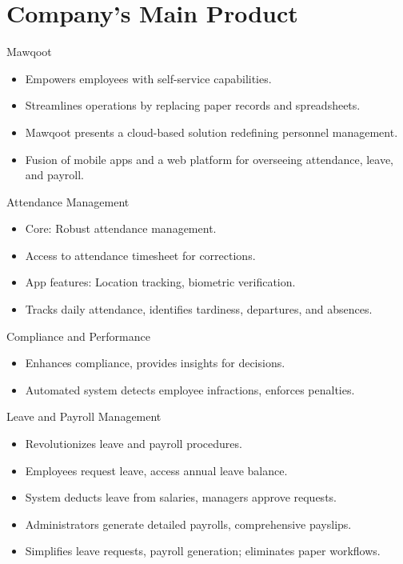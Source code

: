 \documentclass{loyola-beamer}
\begin{document}
\section{Company's Main Product}

\begin{frame}{Mawqoot}
	\begin{itemize}
		\item Empowers employees with self-service capabilities.
		\item Streamlines operations by replacing paper records and spreadsheets.
		\item Mawqoot presents a cloud-based solution redefining personnel management.
		\item Fusion of mobile apps and a web platform for overseeing attendance, leave, and payroll.
	\end{itemize}
\end{frame}

\begin{frame}{Attendance Management}
	\begin{itemize}
		\item Core: Robust attendance management.
		\item Access to attendance timesheet for corrections.
		\item App features: Location tracking, biometric verification.
		\item Tracks daily attendance, identifies tardiness, departures, and absences.
	\end{itemize}
\end{frame}

\begin{frame}{Compliance and Performance}
	\begin{itemize}
		\item Enhances compliance, provides insights for decisions.
		\item Automated system detects employee infractions, enforces penalties.
	\end{itemize}
\end{frame}

\begin{frame}{Leave and Payroll Management}
	\begin{itemize}
		\item Revolutionizes leave and payroll procedures.
		\item Employees request leave, access annual leave balance.
		\item System deducts leave from salaries, managers approve requests.
		\item Administrators generate detailed payrolls, comprehensive payslips.
		\item Simplifies leave requests, payroll generation; eliminates paper workflows.
	\end{itemize}
\end{frame}
\end{document}
